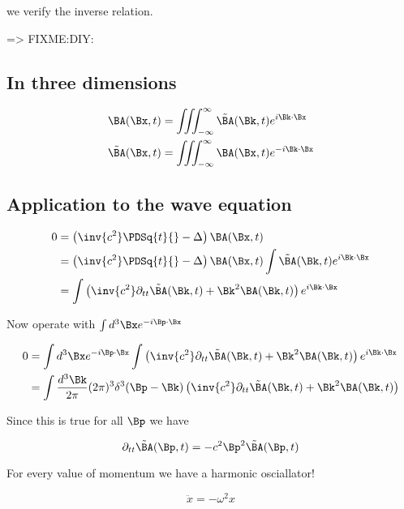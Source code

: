 we verify the inverse relation.

=> FIXME:DIY:

\subsection{In three dimensions}

\begin{align}\label{eqn:relativisticElectrodynamicsL15:470}
\BA(\Bx, t) &= \iiint_{-\infty}^\infty \tilde{\BA}(\Bk, t) e^{i \Bk \cdot \Bx} \\
\tilde{\BA}(\Bx, t) &= \iiint_{-\infty}^\infty \BA(\Bx, t) e^{-i \Bk \cdot \Bx}
\end{align}

\subsection{Application to the wave equation}

\begin{align*}
0 &= 
\left( \inv{c^2} \PDSq{t}{} - \Delta \right) \BA(\Bx, t) \\
&=
\left( \inv{c^2} \PDSq{t}{} - \Delta \right) \BA(\Bx, t)
\int \tilde{\BA}(\Bk, t) e^{i \Bk \cdot \Bx} \\
&=
\int 
\left( 
\inv{c^2} \partial_{tt} \tilde{\BA}(\Bk, t) + \Bk^2 \BA(\Bk, t)
\right)
e^{i \Bk \cdot \Bx} 
\end{align*}

Now operate with $\int d^3 \Bx e^{-i \Bp \cdot \Bx }$

\begin{align*}
0 &=
\int d^3 \Bx e^{-i \Bp \cdot \Bx }
\int 
\left( 
\inv{c^2} \partial_{tt} \tilde{\BA}(\Bk, t) + \Bk^2 \BA(\Bk, t)
\right)
e^{i \Bk \cdot \Bx}  \\
&=
\int \frac{d^3 \Bk}{2\pi} (2\pi)^3 \delta^3(\Bp -\Bk) 
\left( 
\inv{c^2} \partial_{tt} \tilde{\BA}(\Bk, t) + \Bk^2 \BA(\Bk, t)
\right)
\end{align*}

Since this is true for all $\Bp$ we have

\begin{equation}\label{eqn:relativisticElectrodynamicsL15:490}
\partial_{tt} \tilde{\BA}(\Bp, t) = -c^2 \Bp^2 \tilde{\BA}(\Bp, t) 
\end{equation}

For every value of momentum we have a harmonic osciallator!

\begin{equation}\label{eqn:relativisticElectrodynamicsL15:510}
\ddot{x} = -\omega^2 x
\end{equation}

